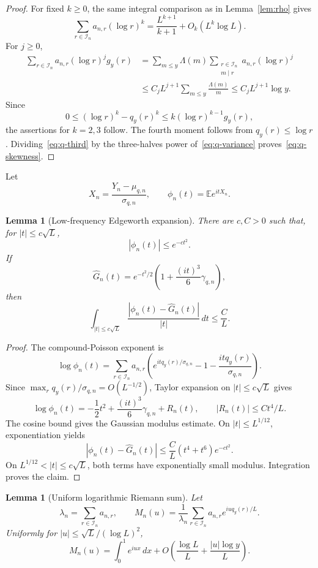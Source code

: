 \documentclass[11pt]{article}
\newtheorem{lemma}[theorem]{Lemma}
\theoremstyle{remark}
\newcommand{\Ee}{\mathbb E}
\newcommand{\dd}{\,d}
\begin{document}
\begin{proof}
For fixed $k\ge0$, the same integral comparison as in
Lemma~\ref{lem:rho} gives
\[
 \sum_{r\in\mathcal I_n}a_{n,r}(\log r)^k
 =\frac{L^{k+1}}{k+1}+O_k(L^k\log L).
\]
For $j\ge0$,
\begin{align*}
 \sum_{r\in\mathcal I_n}a_{n,r}(\log r)^jg_y(r)
 &=\sum_{m\le y}\Lambda(m)
   \sum_{\substack{r\in\mathcal I_n\\m\mid r}}
   a_{n,r}(\log r)^j\\
 &\le C_jL^{j+1}\sum_{m\le y}\frac{\Lambda(m)}m
 \le C_jL^{j+1}\log y.
\end{align*}
Since
\[
 0\le(\log r)^k-q_y(r)^k
 \le k(\log r)^{k-1}g_y(r),
\]
the assertions for $k=2,3$ follow.  The fourth moment follows from
$q_y(r)\le\log r$.  Dividing~\eqref{eq:q-third} by the three-halves power
of~\eqref{eq:q-variance} proves~\eqref{eq:q-skewness}.
\end{proof}

Let
\[
 X_n=\frac{Y_n-\mu_{q,n}}{\sigma_{q,n}},
 \qquad
 \phi_n(t)=\Ee e^{itX_n}.
\]

\begin{lemma}[Low-frequency Edgeworth expansion]
\label{lem:edgeworth-low}
There are $c,C>0$ such that, for $|t|\le c\sqrt L$,
\[
 |\phi_n(t)|\le e^{-ct^2}.
\]
If
\[
 \widehat G_n(t)=e^{-t^2/2}\left(1+\frac{(it)^3}{6}\gamma_{q,n}\right),
\]
then
\[
 \int_{|t|\le c\sqrt L}
 \frac{|\phi_n(t)-\widehat G_n(t)|}{|t|}\dd t
 \le \frac CL.
\]
\end{lemma}

\begin{proof}
The compound-Poisson exponent is
\[
 \log\phi_n(t)=\sum_{r\in\mathcal I_n}a_{n,r}
 \left(e^{itq_y(r)/\sigma_{q,n}}-1-\frac{itq_y(r)}{\sigma_{q,n}}\right).
\]
Since $\max_rq_y(r)/\sigma_{q,n}=O(L^{-1/2})$, Taylor expansion on
$|t|\le c\sqrt L$ gives
\[
 \log\phi_n(t)=-\frac12t^2+\frac{(it)^3}{6}\gamma_{q,n}+R_n(t),
 \qquad |R_n(t)|\le Ct^4/L.
\]
The cosine bound gives the Gaussian modulus estimate.  On
$|t|\le L^{1/12}$, exponentiation yields
\[
 |\phi_n(t)-\widehat G_n(t)|
 \le \frac C L(t^4+t^6)e^{-ct^2}.
\]
On $L^{1/12}<|t|\le c\sqrt L$, both terms have exponentially small
modulus.  Integration proves the claim.
\end{proof}

\begin{lemma}[Uniform logarithmic Riemann sum]
\label{lem:log-Riemann-edgeworth}
Let
\[
 \lambda_n=\sum_{r\in\mathcal I_n}a_{n,r},
 \qquad
 M_n(u)=\frac1{\lambda_n}\sum_{r\in\mathcal I_n}
 a_{n,r}e^{iuq_y(r)/L}.
\]
Uniformly for $|u|\le\sqrt L/(\log L)^2$,
\begin{equation}
\label{eq:log-Riemann-edgeworth}
 M_n(u)=\int_0^1e^{iux}\dd x
 +O\!\left(\frac{\log L}{L}+\frac{|u|\log y}{L}\right).
\end{equation}
\end{lemma}
\end{document}
